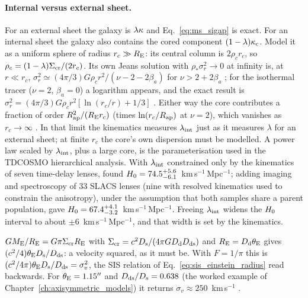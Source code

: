 \paragraph{Internal versus external sheet.}  For an external sheet the galaxy
is $\lambda\kappa$ and Eq.~\eqref{eq:ms_sigap} is exact.  For an internal
sheet the galaxy also contains the cored component $(1-\lambda)\kappa_{\rm c}$.
Model it as a uniform sphere of radius $r_c\gg R_{\rm E}$: its central column
is $2\rho_cr_c$, so $\rho_c=(1-\lambda)\Sigma_{\mathrm{cr}}/(2r_c)$.  Its own Jeans
solution with $\rho_\ast\sigma_r^2\to0$ at infinity is, at $r\ll r_c$,
$\sigma_r^2\simeq(4\pi/3)G\rho_cr^2/(\nu-2-2\beta_a)$ for
$\nu>2+2\beta_a$ ; for the isothermal tracer
($\nu=2$, $\beta_a=0$) a logarithm appears, and the exact result is
$\sigma_r^2=(4\pi/3)G\rho_cr^2[\ln(r_c/r)+1/3]$ .  Either
way the core contributes a fraction of order $R_{\rm ap}^2/(R_{\rm E}r_c)$
(times $\ln(r_c/R_{\rm ap})$ at $\nu=2$), which vanishes as
$r_c\to\infty$ .  In that limit the kinematics measures
$\lambda_{\rm int}$ just as it measures $\lambda$ for an external sheet; at
finite $r_c$ the core's own dispersion must be modelled.  A power law scaled
by $\lambda_{\rm int}$, plus a large core, is the parameterisation used in
the TDCOSMO hierarchical analysis.  With $\lambda_{\rm int}$ constrained only
by the kinematics of seven time-delay lenses, \citet{Birrer2020} found
$H_0=74.5^{+5.6}_{-6.1}$~km\,s$^{-1}$\,Mpc$^{-1}$; adding imaging and
spectroscopy of 33 SLACS lenses (nine with resolved kinematics used to
constrain the anisotropy), under the assumption that both samples share a
parent population, gave $H_0=67.4^{+4.1}_{-3.2}$~km\,s$^{-1}$\,Mpc$^{-1}$.
Freeing $\lambda_{\rm int}$ widens the $H_0$ interval to about
$\pm6$~km\,s$^{-1}$\,Mpc$^{-1}$, and that width is set by the kinematics.

\begin{annotation}
$GM_{\rm E}/R_{\rm E}=G\pi\Sigma_{\mathrm{cr}} R_{\rm E}$ with
$\Sigma_{\mathrm{cr}}=c^2D_{\mathrm{s}}/(4\pi GD_{\mathrm{d}}D_{\mathrm{ds}})$ and $R_{\rm E}=D_{\mathrm{d}}\theta_{\mathrm{E}}$ gives
$(c^2/4)\theta_{\mathrm{E}}D_{\mathrm{s}}/D_{\mathrm{ds}}$: a velocity squared, as it must be.  With
$F=1/\pi$ this is $(c^2/4\pi)\theta_{\mathrm{E}}D_{\mathrm{s}}/D_{\mathrm{ds}}=\sigma_v^2$, the SIS relation
of Eq.~\eqref{eq:sis_einstein_radius} read backwards.  For
$\theta_{\mathrm{E}}=1.15''$ and $D_{\mathrm{ds}}/D_{\mathrm{s}}=0.638$ (the worked example of
Chapter~\ref{ch:axisymmetric_models}) it returns
$\sigma_v\approx250$~km\,s$^{-1}$ .
\end{annotation}

